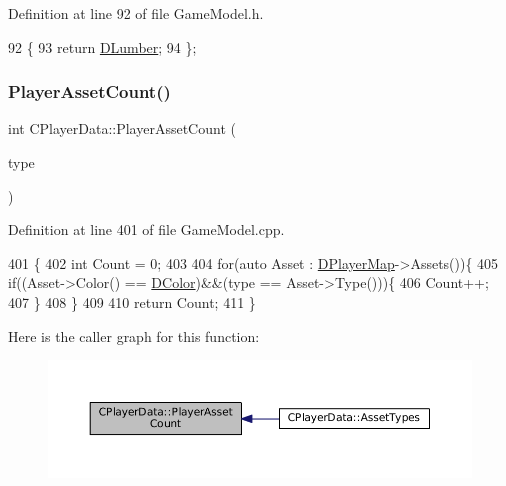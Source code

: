 Definition at line 92 of file Game\+Model.\+h.


\begin{DoxyCode}
92                           \{
93             \textcolor{keywordflow}{return} \hyperlink{classCPlayerData_adf3bf2fa49b5c8a4fb9a478d95f688c4}{DLumber};  
94         \};
\end{DoxyCode}
\hypertarget{classCPlayerData_a3fe55bd902f7a819c0689825d8ad3e4c}{}\label{classCPlayerData_a3fe55bd902f7a819c0689825d8ad3e4c} 
\subsubsection{\texorpdfstring{Player\+Asset\+Count()}{PlayerAssetCount()}}
{\footnotesize\ttfamily int C\+Player\+Data\+::\+Player\+Asset\+Count (\begin{DoxyParamCaption}\item[{\hyperlink{GameDataTypes_8h_a5600d4fc433b83300308921974477fec}{E\+Asset\+Type}}]{type }\end{DoxyParamCaption})}



Definition at line 401 of file Game\+Model.\+cpp.


\begin{DoxyCode}
401                                                 \{
402     \textcolor{keywordtype}{int} Count = 0;
403     
404     \textcolor{keywordflow}{for}(\textcolor{keyword}{auto} Asset : \hyperlink{classCPlayerData_a452163191cd4603e1e38dd8d4bb9691c}{DPlayerMap}->Assets())\{
405         \textcolor{keywordflow}{if}((Asset->Color() == \hyperlink{classCPlayerData_a65d69aaa09c8fc0f7ddfa5e858313085}{DColor})&&(type == Asset->Type()))\{
406             Count++;
407         \}
408     \}
409     
410     \textcolor{keywordflow}{return} Count;
411 \}
\end{DoxyCode}
Here is the caller graph for this function\+:\nopagebreak
\begin{figure}[H]
\begin{center}
\leavevmode
\includegraphics[width=350pt]{classCPlayerData_a3fe55bd902f7a819c0689825d8ad3e4c_icgraph}
\end{center}
\end{figure}
\hypertarget{classCPlayerData_a9a54d695ff57c633dfb3a18c98408c54}{}\label{classCPlayerData_a9a54d695ff57c633dfb3a18c98408c54} 
